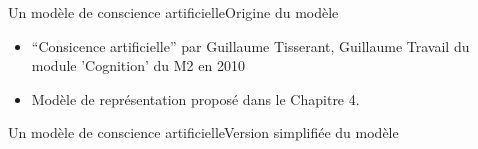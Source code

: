 \begin{frame}{Un modèle de conscience artificielle}{Origine du modèle}
\begin{itemize}
  \item ``Consicence
  artificielle'' par Guillaume Tisserant, Guillaume Travail du module
  'Cognition' du M2 en 2010
  \item Modèle de représentation proposé dans le Chapitre 4.
\end{itemize}
\end{frame}

\begin{frame}{Un modèle de conscience artificielle}{Version simplifiée du
modèle}
\begin{center}
\end{center}
\end{frame}

